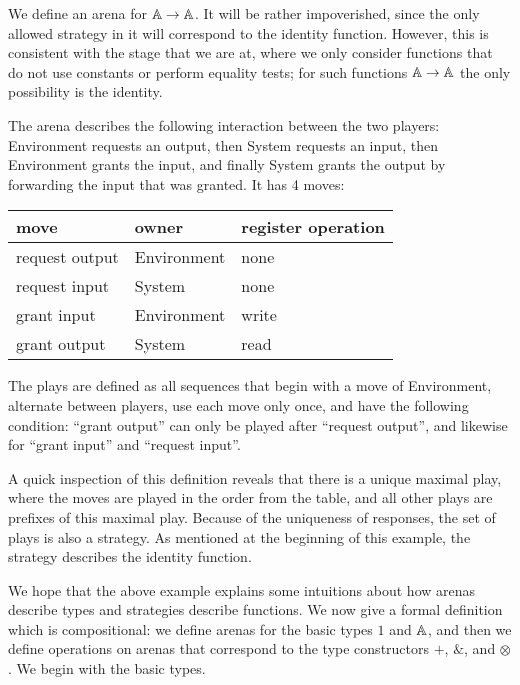 \documentclass[a4paper,UKenglish,cleveref, autoref, numberwithinsect, thm-restate]{lipics-v2021}
\begin{document}
\begin{example}\label{ex:identity-function-without-equality-tests-and-constants}
    We define an arena for $\mathbb A \to \mathbb A$. It will be rather impoverished, since the  only allowed strategy in it will correspond to the identity function. However, this is consistent with the stage that we are at, where we only consider functions that do not use constants or perform equality tests; for such functions $\mathbb A\to\mathbb A$ the only possibility is the identity.

     The arena describes the following interaction between the two players: Environment  requests an output, then System requests an input, then Environment grants the input, and finally System grants the output by forwarding the input that was granted. It has 4 moves:
    \begin{center}
        \begin{tabular}{lll}
         move & owner & register operation \\
            \hline
            request output & Environment & none \\
            request input & System & none \\
            grant input & Environment & write \\
            grant output & System & read 
        \end{tabular}    
    \end{center}
    The plays are defined as all sequences that begin with a move of Environment, alternate between players, use each move only once, and have the following condition:  ``grant output'' can only be played after ``request output'', and likewise for ``grant input'' and ``request input''.  

    A quick inspection of this definition reveals that there is a unique maximal play, where the moves are played in the order from the table, and all other plays are prefixes of this maximal play. Because of the uniqueness of responses, the set of plays is also a strategy. As mentioned at the beginning of this example, the strategy describes the identity function.  \exampleend
\end{example}

We hope that the above example explains some intuitions about how arenas describe types and strategies describe functions. We now give a formal definition which is compositional: we define arenas for the basic types $1$ and $\mathbb A$, and then we define operations on arenas that correspond to the type constructors  $+$, $\&$, and $\otimes$. We begin with the basic types.
\end{document}
